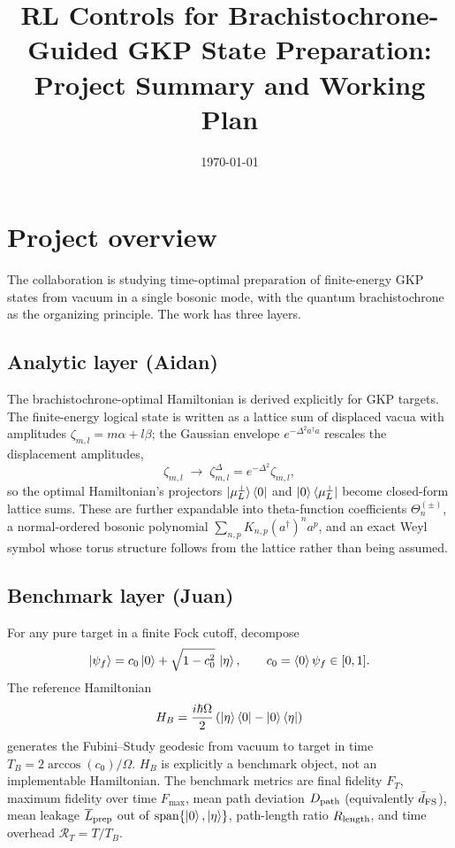 \documentclass[11pt]{article}
\title{RL Controls for Brachistochrone-Guided GKP State Preparation:\\ Project Summary and Working Plan}
\author{}
\date{\today}
\newcommand{\adag}{a^\dagger}
\begin{document}
\maketitle

\section{Project overview}

The collaboration is studying time-optimal preparation of finite-energy GKP states from vacuum in a single bosonic mode, with the quantum brachistochrone as the organizing principle. The work has three layers.

\subsection*{Analytic layer (Aidan)}

The brachistochrone-optimal Hamiltonian is derived explicitly for GKP targets. The finite-energy logical state is written as a lattice sum of displaced vacua with amplitudes $\zeta_{m,l} = m\alpha + l\beta$; the Gaussian envelope $e^{-\Delta^2 \adag a}$ rescales the displacement amplitudes,
\begin{equation}
\zeta_{m,l} \;\longrightarrow\; \zeta^\Delta_{m,l} = e^{-\Delta^2}\zeta_{m,l},
\end{equation}
so the optimal Hamiltonian's projectors $\ket{\mu_L^\perp}\bra{0}$ and $\ket{0}\bra{\mu_L^\perp}$ become closed-form lattice sums. These are further expandable into theta-function coefficients $\Theta_n^{(\pm)}$, a normal-ordered bosonic polynomial $\sum_{n,p} K_{n,p}(\adag)^n a^p$, and an exact Weyl symbol whose torus structure follows from the lattice rather than being assumed.

\subsection*{Benchmark layer (Juan)}

For any pure target in a finite Fock cutoff, decompose
\begin{equation}
\ket{\psi_f} = c_0\ket{0} + \sqrt{1-c_0^2}\,\ket{\eta},
\qquad c_0 = \braket{0}{\psi_f} \in [0,1].
\end{equation}
The reference Hamiltonian
\begin{equation}
H_B = \frac{i\hbar\Omega}{2}\left(\ket{\eta}\bra{0} - \ket{0}\bra{\eta}\right)
\end{equation}
generates the Fubini--Study geodesic from vacuum to target in time $T_B = 2\arccos(c_0)/\Omega$. $H_B$ is explicitly a benchmark object, not an implementable Hamiltonian. The benchmark metrics are final fidelity $F_T$, maximum fidelity over time $F_{\max}$, mean path deviation $D_{\rm path}$ (equivalently $\bar d_{\rm FS}$), mean leakage $\overline{L}_{\rm prep}$ out of $\mathrm{span}\{\ket{0},\ket{\eta}\}$, path-length ratio $R_{\rm length}$, and time overhead $\mathcal{R}_T = T/T_B$.
\end{document}
